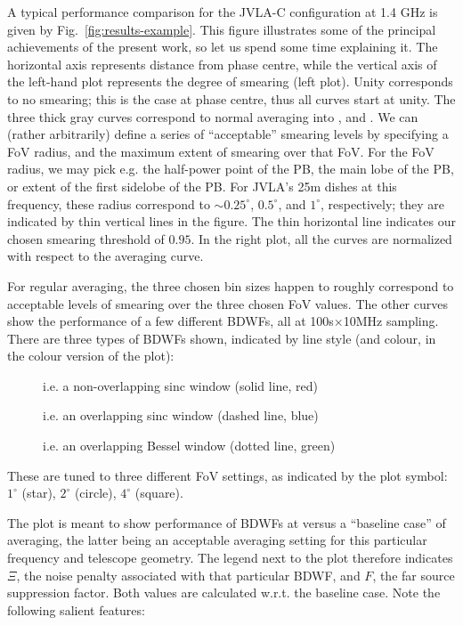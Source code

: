 \documentclass[useAMS,usenatbib]{mn2e}
\begin{document}
A typical performance comparison for the JVLA-C configuration at 1.4 GHz is given by Fig.~\ref{fig:results-example}.
This figure illustrates some of the principal achievements of the present work, so let us spend some time explaining it.
The horizontal axis represents distance from phase centre, while the vertical axis of the left-hand plot represents  the
degree of smearing (left plot). Unity corresponds to no smearing; this is the case at phase centre, thus all curves
start at unity. The three thick gray curves correspond to normal averaging into ,  and
. We can (rather arbitrarily) define a series of ``acceptable'' smearing levels by specifying a  FoV
radius, and the maximum extent of smearing over that FoV. For the FoV radius, we may pick e.g. the half-power point  of
the PB, the main lobe of the PB, or extent of the first sidelobe of the PB. For JVLA's 25m dishes at this frequency,
these radius correspond to $\sim0.25^\circ$, $0.5^\circ$, and $1^\circ$, respectively; they are indicated by thin
vertical lines in the figure. The thin horizontal line indicates our chosen smearing threshold of $0.95$. In the right
plot,  all the curves are normalized with respect to the  averaging curve.

For regular averaging, the three chosen bin sizes happen to roughly correspond to acceptable levels of smearing over the
three chosen FoV values. The other curves show the performance of a few different BDWFs, all at 100s$\times$10MHz
sampling. There are three types of BDWFs shown, indicated by line style (and colour, in the colour version of the plot):
\begin{description}
\item[] i.e. a non-overlapping sinc window (solid line, red)
\item[] i.e. an overlapping sinc window (dashed line, blue)
\item[] i.e. an overlapping Bessel window (dotted line, green)
\end{description}
These are tuned to three different FoV settings, as indicated by the plot symbol: $1^\circ$ (star), $2^\circ$ (circle),
$4^\circ$ (square). 

The plot is meant to show performance of BDWFs at  versus a ``baseline case'' of  averaging, 
the latter being an acceptable averaging setting for this particular frequency and telescope geometry. The legend 
next to the plot therefore indicates $\Xi$, the noise penalty associated with that particular BDWF, and $F$, the 
far source suppression factor. Both values are calculated w.r.t. the baseline case. Note the following salient features:
\end{document}
